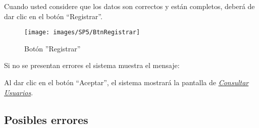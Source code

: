             Cuando usted considere que los datos son correctos y están completos, deberá de dar clic en el botón “Registrar”.
            
            \begin{figure}[!hbtp]
                \centering
                \hypertarget{btnreg}{\texttt{[image: images/SP5/BtnRegistrar]}}
                \caption{Botón ''Registrar''}
                \label{btnreg}
            \end{figure}
            
            Si no se presentan errores el sistema muestra el mensaje:
            
            	 
        
            Al dar clic en el botón “Aceptar”, el sistema mostrará la pantalla de  \hyperlink{consultarUs}{\textit{Consultar Usuarios}}.
    
            \subsection{Posibles errores} 
        
